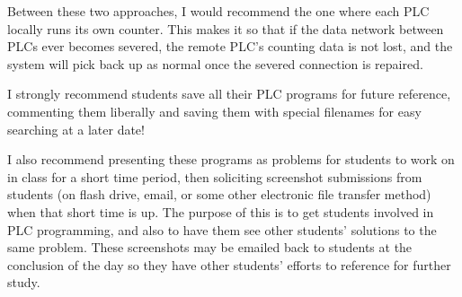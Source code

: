 Between these two approaches, I would recommend the one where each PLC locally runs its own counter.  This makes it so that if the data network between PLCs ever becomes severed, the remote PLC's counting data is not lost, and the system will pick back up as normal once the severed connection is repaired.

\vskip 10pt

I strongly recommend students save all their PLC programs for future reference, commenting them liberally and saving them with special filenames for easy searching at a later date!

\vskip 10pt

I also recommend presenting these programs as problems for students to work on in class for a short time period, then soliciting screenshot submissions from students (on flash drive, email, or some other electronic file transfer method) when that short time is up.  The purpose of this is to get students involved in PLC programming, and also to have them see other students' solutions to the same problem.  These screenshots may be emailed back to students at the conclusion of the day so they have other students' efforts to reference for further study.






